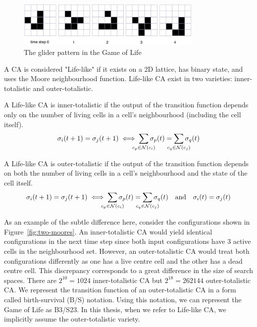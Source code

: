 \begin{figure}[H]
\centering
\includegraphics[width=0.8\textwidth]{images/life-glider.png}
\caption{The glider pattern in the Game of Life \cite{dorin2012framework}}
\label{fig:life-glider}
\end{figure}

A CA is considered "Life-like" if it exists on a 2D lattice, has binary state, and uses the Moore neighbourhood function. Life-like CA exist in two varieties: inner-totalistic and outer-totalistic.

\begin{definition}
A Life-like CA is inner-totalistic if the output of the transition function depends only on the number of living cells in a cell's neighbourhood (including the cell itself).
\begin{equation}
  \sigma_i(t+1) = \sigma_j(t+1) \iff \sum_{\mathclap{c_p \in \mathcal{N}(c_i)}}\sigma_p(t) = \sum_{\mathclap{c_q \in \mathcal{N}(c_j)}}\sigma_q(t)
\end{equation}
\label{def:inner-totalistic}
\end{definition}

\begin{definition}
A Life-like CA is outer-totalistic if the output of the transition function depends on both the number of living cells in a cell's neighbourhood and the state of the cell itself.
\begin{equation}
  \sigma_i(t+1) = \sigma_j(t+1) \iff \sum_{\mathclap{c_p \in \mathcal{N}(c_i)}}\sigma_p(t) = \sum_{\mathclap{c_q \in \mathcal{N}(c_j)}}\sigma_q(t) \quad \textnormal{and} \quad \sigma_i(t) = \sigma_j(t) 
\end{equation}
\label{def:outer-totalistic}
\end{definition}

As an example of the subtle difference here, consider the configurations shown in Figure~\ref{fig:two-moores}. An inner-totalistic CA would yield identical configurations in the next time step since both input configurations have 3 active cells in the neighbourhood set. However, an outer-totalistic CA would treat both configurations differently as one has a live centre cell and the other has a dead centre cell. This discrepancy corresponds to a great difference in the size of search spaces. There are $2^{10}=1024$ inner-totalistic CA but $2^{18} = 262144$ outer-totalistic CA. We represent the transition function of an outer-totalistic CA in a form called birth-survival (B/S) notation. Using this notation, we can represent the Game of Life as B3/S23. In this thesis, when we refer to Life-like CA, we implicitly assume the outer-totalistic variety.\\

